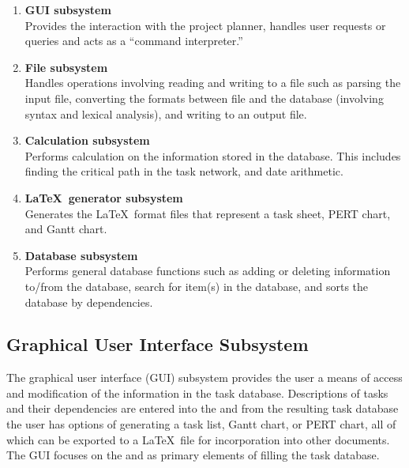 \begin{enumerate}

\item {\bf GUI subsystem}\\
Provides the interaction with the project planner, handles user
requests or queries and acts as a ``command interpreter.''

\item {\bf File subsystem}\\
Handles operations involving reading and writing to a file such as
parsing the input file, converting the formats between file and the
database (involving syntax and lexical analysis), and writing to an
output file.

\item {\bf Calculation subsystem}\\
Performs calculation on the information stored in the database.  This
includes finding the critical path in the task network, and date
arithmetic.

\item {\bf \LaTeX\ generator subsystem}\\
Generates the \LaTeX\ format files that represent a task sheet, PERT
chart, and Gantt chart.

\item {\bf Database subsystem}\\
Performs general database functions such as adding  or deleting
information to/from the database, search for item(s) in the database,
and sorts the database by dependencies.

\end{enumerate}

%
%

\subsection{Graphical User Interface Subsystem}

The graphical user interface (GUI) subsystem provides the user a means
of access and modification of the information in the task database.
Descriptions of tasks and their dependencies are entered into the
\tiscreen\/ and from the resulting task database the user has options
of generating a task list, Gantt chart, or PERT chart, all of which
can be exported to a \LaTeX\ file for incorporation into other
documents.  The GUI focuses on the \pscreen\/ and \tiscreen\/ as
primary elements of filling the task database.

